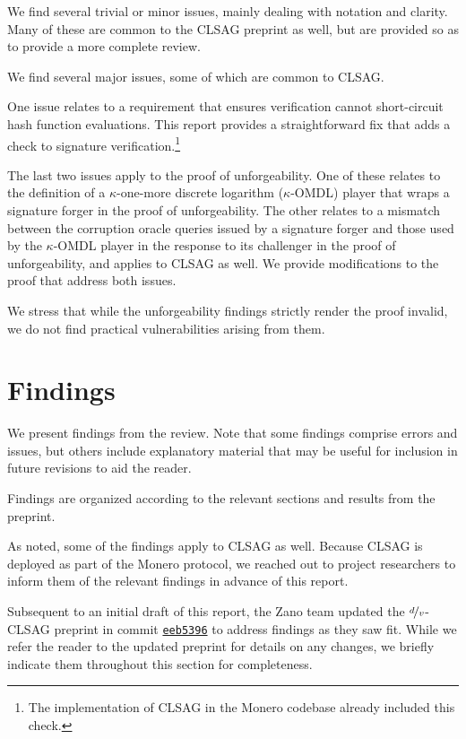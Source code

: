 \documentclass{article}
\begin{document}
We find several trivial or minor issues, mainly dealing with notation and clarity.
Many of these are common to the CLSAG preprint as well, but are provided so as to provide a more complete review.

We find several major issues, some of which are common to CLSAG.

One issue relates to a requirement that ensures verification cannot short-circuit hash function evaluations.
This report provides a straightforward fix that adds a check to signature verification.\footnote{The implementation of CLSAG in the Monero codebase already included this check.}

The last two issues apply to the proof of unforgeability.
One of these relates to the definition of a $\kappa$-one-more discrete logarithm ($\kappa$-OMDL) player that wraps a signature forger in the proof of unforgeability.
The other relates to a mismatch between the corruption oracle queries issued by a signature forger and those used by the $\kappa$-OMDL player in the response to its challenger in the proof of unforgeability, and applies to CLSAG as well.
We provide modifications to the proof that address both issues.

We stress that while the unforgeability findings strictly render the proof invalid, we do not find practical vulnerabilities arising from them.


\section{Findings}

We present findings from the review.
Note that some findings comprise errors and issues, but others include explanatory material that may be useful for inclusion in future revisions to aid the reader.

Findings are organized according to the relevant sections and results from the preprint.

As noted, some of the findings apply to CLSAG as well.
Because CLSAG is deployed as part of the Monero protocol, we reached out to project researchers to inform them of the relevant findings in advance of this report.

Subsequent to an initial draft of this report, the Zano team updated the $\nicefrac{d}{v}$-CLSAG preprint in commit \href{https://github.com/hyle-team/docs/tree/eeb53967b1f11e0178df834d7d3e3e6121ff20ff/zano/dv-CLSAG-extension}{\texttt{eeb5396}} to address findings as they saw fit.
While we refer the reader to the updated preprint for details on any changes, we briefly indicate them throughout this section for completeness.
\end{document}
